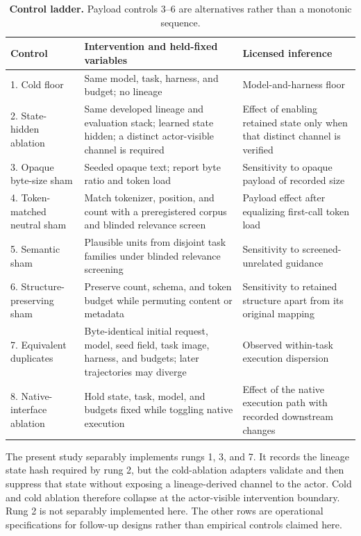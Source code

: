 \documentclass[10pt,twocolumn]{article}
\begin{document}
\begin{table}[t]
\caption*{\textbf{Control ladder.} Payload controls 3--6 are alternatives rather than a monotonic sequence.}
\centering\scriptsize
\begin{tabularx}{\textwidth}{@{}p{}X X@{}}
\toprule
\textbf{Control} & \textbf{Intervention and held-fixed variables} & \textbf{Licensed inference}\\
\midrule
1. Cold floor & Same model, task, harness, and budget; no lineage & Model-and-harness floor\\
2. State-hidden ablation & Same developed lineage and evaluation stack; learned state hidden; a distinct actor-visible channel is required & Effect of enabling retained state only when that distinct channel is verified\\
3. Opaque byte-size sham & Seeded opaque text; report byte ratio and token load & Sensitivity to opaque payload of recorded size\\
4. Token-matched neutral sham & Match tokenizer, position, and count with a preregistered corpus and blinded relevance screen & Payload effect after equalizing first-call token load\\
5. Semantic sham & Plausible units from disjoint task families under blinded relevance screening & Sensitivity to screened-unrelated guidance\\
6. Structure-preserving sham & Preserve count, schema, and token budget while permuting content or metadata & Sensitivity to retained structure apart from its original mapping\\
7. Equivalent duplicates & Byte-identical initial request, model, seed field, task image, harness, and budgets; later trajectories may diverge & Observed within-task execution dispersion\\
8. Native-interface ablation & Hold state, task, model, and budgets fixed while toggling native execution & Effect of the native execution path with recorded downstream changes\\
\bottomrule
\end{tabularx}
\end{table}

The present study separably implements rungs 1, 3, and 7. It records the
lineage state hash required by rung 2, but the cold-ablation adapters
validate and then suppress that state without exposing a lineage-derived
channel to the actor. Cold and cold ablation therefore collapse at the
actor-visible intervention boundary. Rung 2 is not separably implemented
here. The other rows are operational specifications for follow-up
designs rather than empirical controls claimed here.
\end{document}
